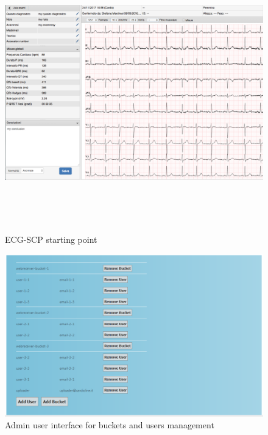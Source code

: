 \begin{figure}[h]
    \centering
    \includegraphics[width=\textwidth,height=12cm,keepaspectratio]{img/scp_view}
    \caption{ECG-SCP starting point}
    \label{fig:scp_view}
\end{figure}

\begin{figure}[h]
    \includegraphics[width=\textwidth]{img/webreceiver_admin_screenshot}
    \caption{Admin user interface for buckets and users management}
    \label{fig:webreceiver_admin_screenshot}
\end{figure}

